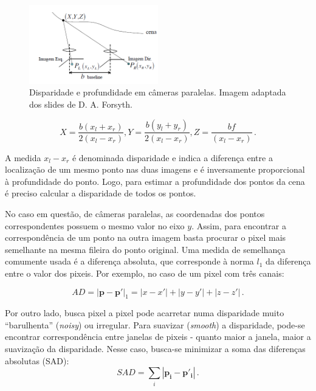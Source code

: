 \documentclass{bmvc2k}
\begin{document}
\begin{figure}[htb] 
\centering
\includegraphics[width=0.5\textwidth]{figs/stereo.png}
\caption{Disparidade e profundidade em câmeras paralelas. Imagem adaptada dos slides de D. A. Forsyth.\label{paralel}}
\end{figure}

\begin{equation}
    \label{eq_disp}
    X = \frac{b(x_l + x_r)}{2(x_l - x_r)},
    Y = \frac{b(y_l + y_r)}{2(x_l - x_r)},
    Z = \frac{bf}{(x_l - x_r)}\,.
\end{equation}

A medida $x_l - x_r$ é denominada disparidade e indica a diferença entre a localização de um mesmo ponto nas duas imagens e é inversamente proporcional à profundidade do ponto. Logo, para estimar a profundidade dos pontos da cena é preciso calcular a disparidade de todos os pontos. 

No caso em questão, de câmeras paralelas, as coordenadas dos pontos correspondentes possuem o mesmo valor no eixo $y$. Assim, para encontrar a correspondência de um ponto na outra imagem basta procurar o pixel mais semelhante na mesma fileira do ponto original. Uma medida de semelhança comumente usada é a diferença absoluta, que corresponde à norma $l_1$ da diferença entre o valor dos pixeis. Por exemplo, no caso de um pixel com três canais:

\begin{equation}
    \label{norma}
    AD = |\bm{p} - \bm{p'}|_1 = |x - x'| + |y - y'| + |z - z'|\,.
\end{equation}

Por outro lado, busca pixel a pixel pode acarretar numa disparidade muito ``barulhenta'' (\textit{noisy}) ou irregular. Para suavizar (\textit{smooth}) a disparidade, pode-se encontrar correspondência entre janelas de pixeis - quanto maior a janela, maior a suavização da disparidade. Nesse caso, busca-se minimizar a soma das diferenças absolutas (SAD):
\begin{equation}
    \label{SAD}
    SAD = \sum_i |\bm{p_i} - \bm{p'_i}|\,.
\end{equation}
\end{document}
